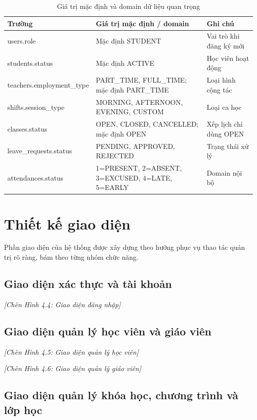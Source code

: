 \documentclass[../DoAn.tex]{subfiles}
\begin{document}
\begin{table}[H]
\centering
\caption{Giá trị mặc định và domain dữ liệu quan trọng}
\label{table:bang4.2}
\scriptsize
\begin{tabular}{|l|p{5cm}|p{4cm}|}
\hline
\textbf{Trường} & \textbf{Giá trị mặc định / domain} & \textbf{Ghi chú} \\ \hline
users.role & Mặc định STUDENT & Vai trò khi đăng ký mới \\ \hline
students.status & Mặc định ACTIVE & Học viên hoạt động \\ \hline
teachers.employment\_type & PART\_TIME, FULL\_TIME; mặc định PART\_TIME & Loại hình cộng tác \\ \hline
shifts.session\_type & MORNING, AFTERNOON, EVENING, CUSTOM & Loại ca học \\ \hline
classes.status & OPEN, CLOSED, CANCELLED; mặc định OPEN & Xếp lịch chỉ dùng OPEN \\ \hline
leave\_requests.status & PENDING, APPROVED, REJECTED & Trạng thái xử lý \\ \hline
attendances.status & 1=PRESENT, 2=ABSENT, 3=EXCUSED, 4=LATE, 5=EARLY & Domain nội bộ \\ \hline
\end{tabular}
\end{table}

\section{Thiết kế giao diện}
\label{section:4.4}

Phần giao diện của hệ thống được xây dựng theo hướng phục vụ thao tác quản trị rõ ràng, bám theo từng nhóm chức năng.

\subsection{Giao diện xác thực và tài khoản}

\textit{[Chèn Hình 4.4: Giao diện đăng nhập]}

\subsection{Giao diện quản lý học viên và giáo viên}

\textit{[Chèn Hình 4.5: Giao diện quản lý học viên]}

\textit{[Chèn Hình 4.6: Giao diện quản lý giáo viên]}

\subsection{Giao diện quản lý khóa học, chương trình và lớp học}
\end{document}

